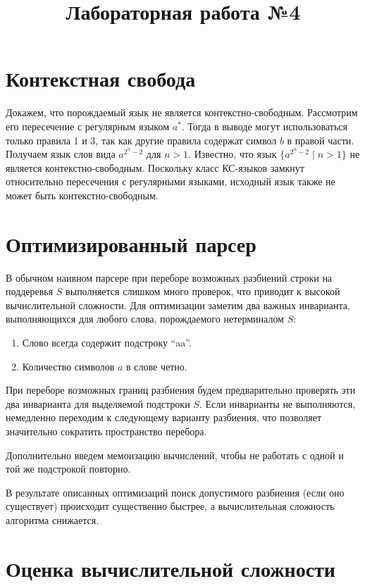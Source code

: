 \documentclass{article}
\title{Лабораторная работа №4}
\author{}
\date{}
\begin{document}
\maketitle

\section{Контекстная свобода}
Докажем, что порождаемый язык не является контекстно-свободным. Рассмотрим его пересечение с регулярным языком \(a^*\). Тогда в выводе могут использоваться только правила 1 и 3, так как другие правила содержат символ \(b\) в правой части. Получаем язык слов вида \(a^{2^n - 2}\) для \(n > 1\). Известно, что язык \(\{a^{2^n - 2} \mid n > 1\}\) не является контекстно-свободным. Поскольку класс КС-языков замкнут относительно пересечения с регулярными языками, исходный язык также не может быть контекстно-свободным.

\section{Оптимизированный парсер}

В обычном наивном парсере при переборе возможных разбиений строки на поддеревья \(S\) выполняется слишком много проверок, что приводит к высокой вычислительной сложности. Для оптимизации заметим два важных инварианта, выполняющихся для любого слова, порождаемого нетерминалом \(S\):
\begin{enumerate}
    \item Слово всегда содержит подстроку ``aa''.
    \item Количество символов \(a\) в слове четно.
\end{enumerate}

При переборе возможных границ разбиения будем предварительно проверять эти два инварианта для выделяемой подстроки \(S\). Если инварианты не выполняются, немедленно переходим к следующему варианту разбиения, что позволяет значительно сократить пространство перебора.

Дополнительно введем мемоизацию вычислений, чтобы не работать с одной и той же подстрокой повторно.

В результате описанных оптимизаций поиск допустимого разбиения (если оно существует) происходит существенно быстрее, а вычислительная сложность алгоритма снижается.

\section{Оценка вычислительной сложности}
\end{document}
